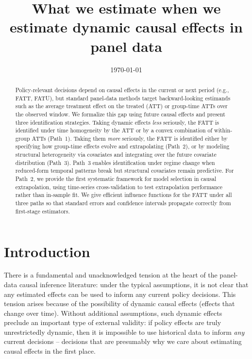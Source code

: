 \documentclass{article}
\title{What we estimate when we estimate dynamic causal effects in panel data}
\date{\today}
\begin{document}
\maketitle
\begin{abstract}
Policy-relevant decisions depend on causal effects in the current or next period (e.g., FATT, FATU), but standard panel-data methods target backward-looking estimands such as the average treatment effect on the treated (ATT) or group-time ATTs over the observed window. We formalize this gap using future causal effects and present three identification strategies. Taking dynamic effects \emph{less} seriously, the FATT is identified under time homogeneity by the ATT or by a convex combination of within-group ATTs (Path~1). Taking them \emph{more} seriously, the FATT is identified either by specifying how group-time effects evolve and extrapolating (Path~2), or by modeling structural heterogeneity via covariates and integrating over the future covariate distribution (Path~3). Path~3 enables identification under regime change when reduced-form temporal patterns break but structural covariates remain predictive. For Path~2, we provide the first systematic framework for model selection in causal extrapolation, using time-series cross-validation to test extrapolation performance rather than in-sample fit. We give efficient influence functions for the FATT under all three paths so that standard errors and confidence intervals propagate correctly from first-stage estimators.
\end{abstract}

\section{Introduction}

There is a fundamental and unacknowledged tension at the heart of the panel-data causal inference literature: under the typical assumptions, it is not clear that any estimated effects can be used to inform any current policy decisions. This tension arises because of the possibility of dynamic causal effects (effects that change over time). Without additional assumptions, such dynamic effects preclude an important type of external validity: if policy effects are truly unrestrictedly dynamic, then it is impossible to use historical data to inform \textit{any} current decisions -- decisions that are presumably why we care about estimating causal effects in the first place.
\end{document}
